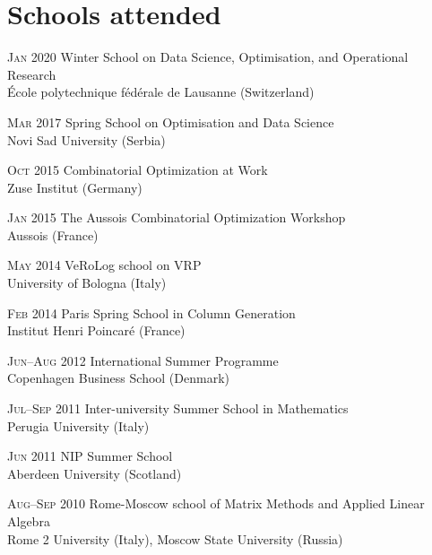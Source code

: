 \section*{Schools attended}

\begin{paracol}{2}
  \textsc{Jan 2020}
\switchcolumn
  Winter School on Data Science, Optimisation, and Operational Research\\
  École polytechnique fédérale de Lausanne (Switzerland)
\end{paracol}

\begin{paracol}{2}
  \textsc{Mar 2017}
\switchcolumn
  Spring School on Optimisation and Data Science\\
  Novi Sad University (Serbia)
\end{paracol}

\begin{paracol}{2}
  \textsc{Oct 2015}
\switchcolumn
  Combinatorial Optimization at Work\\
  Zuse Institut (Germany)
\end{paracol}

\begin{paracol}{2}
  \textsc{Jan 2015}
\switchcolumn
  The Aussois Combinatorial Optimization Workshop\\
  Aussois (France)
\end{paracol}

\begin{paracol}{2}
  \textsc{May 2014}
\switchcolumn
  VeRoLog school on VRP\\
  University of Bologna (Italy)
\end{paracol}

\begin{paracol}{2}
  \textsc{Feb 2014}
\switchcolumn
  Paris Spring School in Column Generation\\
  Institut Henri Poincaré (France)
\end{paracol}

\begin{paracol}{2}
  \textsc{Jun--Aug 2012}
\switchcolumn
  International Summer Programme\\
  Copenhagen Business School (Denmark)
\end{paracol}

\begin{paracol}{2}
  \textsc{Jul--Sep 2011}
\switchcolumn
  Inter-university Summer School in Mathematics\\
  Perugia University (Italy)
\end{paracol}

\begin{paracol}{2}
  \textsc{Jun 2011}
\switchcolumn
  NIP Summer School\\
  Aberdeen University (Scotland)
\end{paracol}

\begin{paracol}{2}
  \textsc{Aug--Sep 2010}
\switchcolumn
  Rome-Moscow school of Matrix Methods and Applied Linear Algebra\\
  Rome 2 University (Italy), Moscow State University (Russia)
\end{paracol}